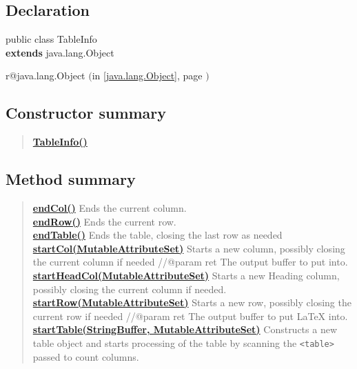 \documentclass[11pt,a4paper]{report}
\makeatletter
\newcommand{\refdefined}[1]{
\expandafter\ifx\csname r@#1\endcsname\relax
\relax\else
{$($in \ref{#1}, page \pageref{#1}$)$}\fi}
\makeatother
\begin{document}
{\subsection{Declaration}{
\small public class TableInfo
\\ {\bf  extends} java.lang.Object
\refdefined{java.lang.Object}}
\subsection{Constructor summary}{
\begin{verse}
\hyperlink{org.stfm.texdoclet.TableInfo()}{{\bf TableInfo()}} \\
\end{verse}
}
\subsection{Method summary}{
\begin{verse}
\hyperlink{org.stfm.texdoclet.TableInfo.endCol()}{{\bf endCol()}} Ends the current column.\\
\hyperlink{org.stfm.texdoclet.TableInfo.endRow()}{{\bf endRow()}} Ends the current row.\\
\hyperlink{org.stfm.texdoclet.TableInfo.endTable()}{{\bf endTable()}} Ends the table, closing the last row as needed\\
\hyperlink{org.stfm.texdoclet.TableInfo.startCol(javax.swing.text.MutableAttributeSet)}{{\bf startCol(MutableAttributeSet)}} Starts a new column, possibly closing the current column if needed //@param ret The output buffer to put \LaTeXe{} into.\\
\hyperlink{org.stfm.texdoclet.TableInfo.startHeadCol(javax.swing.text.MutableAttributeSet)}{{\bf startHeadCol(MutableAttributeSet)}} Starts a new Heading column, possibly closing the current column if needed.\\
\hyperlink{org.stfm.texdoclet.TableInfo.startRow(javax.swing.text.MutableAttributeSet)}{{\bf startRow(MutableAttributeSet)}} Starts a new row, possibly closing the current row if needed //@param ret The output buffer to put \LaTeX{} into.\\
\hyperlink{org.stfm.texdoclet.TableInfo.startTable(java.lang.StringBuffer, javax.swing.text.MutableAttributeSet)}{{\bf startTable(StringBuffer, MutableAttributeSet)}} Constructs a new table object and starts processing of the table by scanning the \texttt{\small \textless table\textgreater } passed to count columns.\\
\end{verse}
}
}
\end{document}

